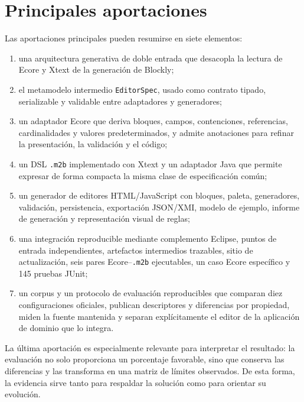 \section{Principales aportaciones}
\label{sec:aportaciones}

Las aportaciones principales pueden resumirse en siete elementos:

\begin{enumerate}
  \item una arquitectura generativa de doble entrada que desacopla la lectura de
  Ecore y Xtext de la generación de Blockly;

  \item el metamodelo intermedio \texttt{EditorSpec}, usado como contrato
  tipado, serializable y validable entre adaptadores y generadores;

  \item un adaptador Ecore que deriva bloques, campos, contenciones,
  referencias, cardinalidades y valores predeterminados, y admite anotaciones
  para refinar la presentación, la validación y el código;

  \item un DSL \texttt{.m2b} implementado con Xtext y un adaptador Java que
  permite expresar de forma compacta la misma clase de especificación común;

  \item un generador de editores HTML/JavaScript con bloques, paleta,
  generadores, validación, persistencia, exportación JSON/XMI, modelo de ejemplo,
  informe de generación y representación visual de reglas;

  \item una integración reproducible mediante complemento Eclipse, puntos de entrada
  independientes, artefactos intermedios trazables, sitio de actualización,
  seis pares Ecore--\texttt{.m2b} ejecutables, un caso Ecore específico y 145
  pruebas JUnit;

  \item un corpus y un protocolo de evaluación reproducibles que comparan diez
  configuraciones oficiales, publican descriptores y diferencias por propiedad,
  miden la fuente mantenida y separan explícitamente el editor de la aplicación
  de dominio que lo integra.
\end{enumerate}

La última aportación es especialmente relevante para interpretar el resultado:
la evaluación no solo proporciona un porcentaje favorable, sino que conserva
las diferencias y las transforma en una matriz de límites observados. De esta
forma, la evidencia sirve tanto para respaldar la solución como para orientar su
evolución.

